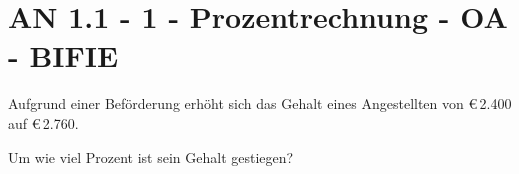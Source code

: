 \section{AN 1.1 - 1 - Prozentrechnung - OA - BIFIE}


\begin{beispiel}[AN 1.1]{1} %
Aufgrund einer Beförderung erhöht sich das Gehalt eines Angestellten von \euro\,2.400 auf \euro\,2.760.

Um wie viel Prozent ist sein Gehalt gestiegen? 

\end{beispiel}